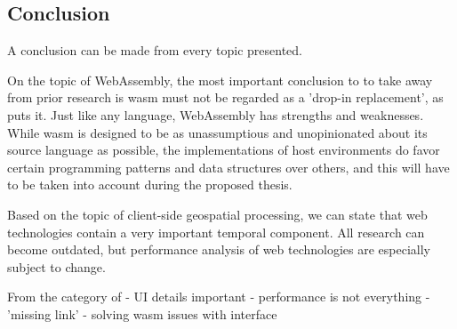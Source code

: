 \subsection{Conclusion}

A conclusion can be made from every topic presented. 

On the topic of WebAssembly, the most important conclusion to to take away from prior research is \ac{wasm} must not be regarded as a 'drop-in replacement', as \cite{melch_performance_2019} puts it. Just like any language, WebAssembly has strengths and weaknesses. While \ac{wasm} is designed to be as unassumptious and unopinionated about its source language as possible, the implementations of host environments do favor certain programming patterns and data structures over others, and this will have to be taken into account during the proposed thesis.

Based on the topic of client-side geospatial processing, we can state that web technologies contain a very important temporal component. All research can become outdated, but performance analysis of web technologies are especially subject to change.  

From the category of 
- UI details important
- performance is not everything
- 'missing link'
- solving wasm issues with interface


